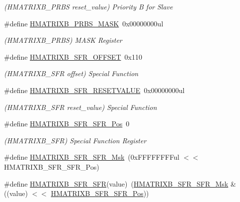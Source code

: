 \begin{DoxyCompactItemize}
\begin{DoxyCompactList}\small\item\em (H\+M\+A\+T\+R\+I\+X\+B\+\_\+\+P\+R\+BS reset\+\_\+value) Priority B for Slave \end{DoxyCompactList}\item 
\#define \mbox{\hyperlink{group___s_a_m_d21___h_m_a_t_r_i_x_b_ga55be008834b446b516397e7a279be596}{H\+M\+A\+T\+R\+I\+X\+B\+\_\+\+P\+R\+B\+S\+\_\+\+M\+A\+SK}}~0x00000000ul
\begin{DoxyCompactList}\small\item\em (H\+M\+A\+T\+R\+I\+X\+B\+\_\+\+P\+R\+BS) M\+A\+SK Register \end{DoxyCompactList}\item 
\#define \mbox{\hyperlink{group___s_a_m_d21___h_m_a_t_r_i_x_b_gad78eab472a708dc0737f8e9af6fbdb52}{H\+M\+A\+T\+R\+I\+X\+B\+\_\+\+S\+F\+R\+\_\+\+O\+F\+F\+S\+ET}}~0x110
\begin{DoxyCompactList}\small\item\em (H\+M\+A\+T\+R\+I\+X\+B\+\_\+\+S\+FR offset) Special Function \end{DoxyCompactList}\item 
\#define \mbox{\hyperlink{group___s_a_m_d21___h_m_a_t_r_i_x_b_ga95ba9b5ac1ee7150547d552e80d562cd}{H\+M\+A\+T\+R\+I\+X\+B\+\_\+\+S\+F\+R\+\_\+\+R\+E\+S\+E\+T\+V\+A\+L\+UE}}~0x00000000ul
\begin{DoxyCompactList}\small\item\em (H\+M\+A\+T\+R\+I\+X\+B\+\_\+\+S\+FR reset\+\_\+value) Special Function \end{DoxyCompactList}\item 
\#define \mbox{\hyperlink{group___s_a_m_d21___h_m_a_t_r_i_x_b_ga0cea7beda28a2ce9ed68288054ed78e2}{H\+M\+A\+T\+R\+I\+X\+B\+\_\+\+S\+F\+R\+\_\+\+S\+F\+R\+\_\+\+Pos}}~0
\begin{DoxyCompactList}\small\item\em (H\+M\+A\+T\+R\+I\+X\+B\+\_\+\+S\+FR) Special Function Register \end{DoxyCompactList}\item 
\#define \mbox{\hyperlink{group___s_a_m_d21___h_m_a_t_r_i_x_b_ga9db3c5b8bf5c84b7fe3f7805d528287d}{H\+M\+A\+T\+R\+I\+X\+B\+\_\+\+S\+F\+R\+\_\+\+S\+F\+R\+\_\+\+Msk}}~(0x\+F\+F\+F\+F\+F\+F\+F\+Ful $<$$<$ H\+M\+A\+T\+R\+I\+X\+B\+\_\+\+S\+F\+R\+\_\+\+S\+F\+R\+\_\+\+Pos)
\item 
\#define \mbox{\hyperlink{group___s_a_m_d21___h_m_a_t_r_i_x_b_gad5546ade174352c506f43daa70d6f66c}{H\+M\+A\+T\+R\+I\+X\+B\+\_\+\+S\+F\+R\+\_\+\+S\+FR}}(value)~(\mbox{\hyperlink{group___s_a_m_d21___h_m_a_t_r_i_x_b_ga9db3c5b8bf5c84b7fe3f7805d528287d}{H\+M\+A\+T\+R\+I\+X\+B\+\_\+\+S\+F\+R\+\_\+\+S\+F\+R\+\_\+\+Msk}} \& ((value) $<$$<$ \mbox{\hyperlink{group___s_a_m_d21___h_m_a_t_r_i_x_b_ga0cea7beda28a2ce9ed68288054ed78e2}{H\+M\+A\+T\+R\+I\+X\+B\+\_\+\+S\+F\+R\+\_\+\+S\+F\+R\+\_\+\+Pos}}))

\end{DoxyCompactItemize}
